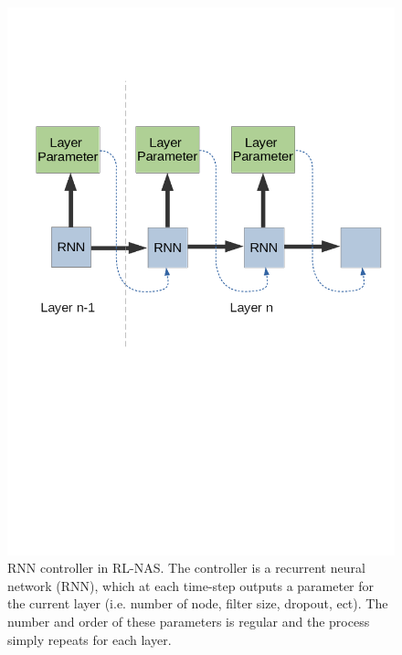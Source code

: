 	\begin{figure}[h]

			\includegraphics[trim=0 320 0 150 ,scale=0.3]{NAS-RL.png}
			\centering
			\caption{RNN controller in RL-NAS. The controller is a recurrent neural network (RNN), which at each time-step outputs a parameter for the current layer (i.e. number of node, filter size, dropout, ect). The number and order of these parameters is regular and the process simply repeats for each layer.   
			}
			\label{fig:RL}

	\end{figure}

